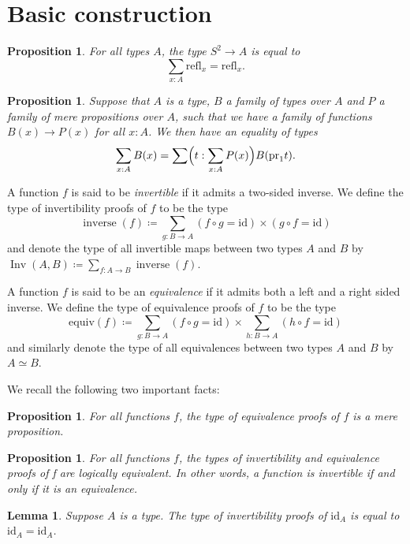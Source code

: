 \documentclass{article}
\theoremstyle{plain}
\newtheorem{proposition}[theorem]{Proposition}
\newtheorem{lemma}[theorem]{Lemma}
\theoremstyle{definition}
\theoremstyle{remark}
\newcommand{\id}{\mathrm{id}}
\newcommand{\isequiv}{\mathrm{equiv}}
\newcommand{\pr}{\mathrm{pr}}
\newcommand{\refl}{\mathrm{refl}}
\newcommand{\sphere}{S^{2}}
\DeclareMathOperator{\inv}{Inv}
\DeclareMathOperator{\inverse}{inverse}
\begin{document}
\section{Basic construction}

\begin{proposition}
  \label{universal-property-sphere}
  For all types \(A\), the type \(\sphere \to A\) is equal to
  \[\sum_{x : A} \refl_{x} = \refl_{x}.\]
\end{proposition}
\begin{proposition}
  \label{family-over-subtype}
  Suppose that \(A\) is a type, \(B\) a family of types over \(A\) and \(P\) a family of mere
  propositions over \(A\), such that we have a family of functions \(B(x) \to P(x)\) for all
  \(x : A\). We then have an equality of types
  \[\sum_{x : A}B(x) = \sum \Bigl(t : \sum_{x : A}P(x)\Bigr) B(\pr_{1}t).\]
\end{proposition}

A function \(f\) is said to be \emph{invertible}
if it admits a two-sided inverse.
We define the type of invertibility proofs of \(f\) to be the type
\[\inverse(f) \coloneq \sum_{g : B \to A}(f \circ g = \id) \times (g \circ f = \id)\]
and denote the type of all invertible maps between two types \(A\) and \(B\) by
\(\inv(A, B) \coloneq \sum_{f : A \to B}\inverse(f)\).

A function \(f\) is said to be an \emph{equivalence} if it admits both a left and a
right sided inverse.
We define the type of equivalence proofs of \(f\) to be the type
\[\isequiv(f) \coloneq \sum_{g : B \to A}(f \circ g = \id) \times
  \sum_{h : B \to A}(h \circ f = \id)\]
and similarly denote the type of all equivalences between two types \(A\) and \(B\)
by~\(A \simeq B\).


We recall the following two important facts:
\begin{proposition}
  \label{is-prop-equiv}
  For all functions \(f\), the type of equivalence proofs of \(f\) is a mere proposition.
\end{proposition}

\begin{proposition}
  \label{inv-implies-equiv}
  For all functions \(f\), the types of invertibility and equivalence proofs of f are
  logically equivalent. In other words, a function is invertible if and only if it is
  an equivalence.
\end{proposition}

\begin{lemma}
  \label{inv-id}
  Suppose \(A\) is a type. The type of invertibility proofs of \(\id_{A}\) is equal
  to \(\id_{A} = \id_{A}\).
\end{lemma}
\end{document}
